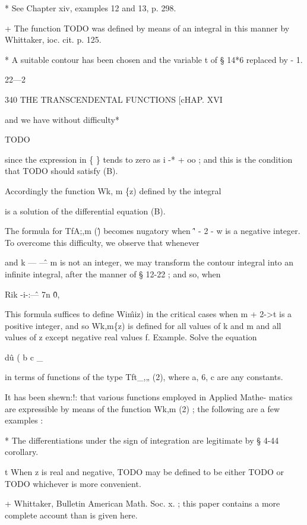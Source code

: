 * See Chapter xiv, examples 12 and 13, p. 298.

+ The function TODO was defined by means of an integral in this manner
by Whittaker, ioc. cit. p. 125.

* A suitable contour has been chosen and the variable t of § 14*6
replaced by - 1.

22—2



340 THE TRANSCENDENTAL FUNCTIONS [cHAP. XVI

and we have without difficulty*

TODO

since the expression in \{ \} tends to zero as i -* + oo ; and this is
the condition that TODO should satisfy (B).

Accordingly the function Wk, m \{z) defined by the integral

is a solution of the differential equation (B).

The formula for TfA;,m (\^) becomes nugatory when \^' - 2 - w is a
negative integer. To overcome this difficulty, we observe that
whenever

and k — \^— m is not an integer, we may transform the contour integral
into an infinite integral, after the manner of § 12-22 ; and so, when

Rik -i-:\^— 7n \^0,

This formula suffices to define Wi\^miz) in the critical cases when m
+ 2->t is a positive integer, and so Wk,m\{z) is defined for all
values of k and m and all values of z except negative real values f.
Example. Solve the equation

d\^u ( b c \_

in terms of functions of the type Tft\_,„ (2), where a, 6, c are any
constants.


It has been shewn:!: that various functions employed in Applied Mathe-
matics are expressible by means of the function Wk,m (2) ; the
following are a few examples :

* The differentiations under the sign of integration are legitimate by
§ 4-44 corollary.

t When z is real and negative, TODO may be defined to be either TODO
or TODO whichever is more convenient.

+ Whittaker, Bulletin American Math. Soc. x. ; this paper contains a
more complete account than is given here.

